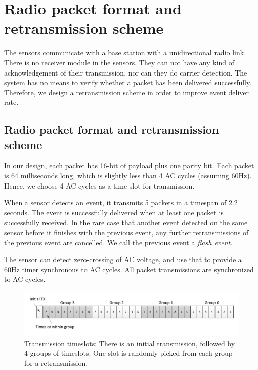 \chapter{Radio packet format and retransmission scheme}\label{chap4}

The sensors communicate with a base station with a unidirectional radio link. There is no receiver module in the sensors. They can not have any kind of acknowledgement of their transmission, nor can they do carrier detection. The system has no means to verify whether a packet has been delivered successfully. Therefore, we design a retransmission scheme in order to improve event deliver rate. 

\section{Radio packet format and retransmission scheme}

In our design, each packet has 16-bit of payload plus one parity bit. Each packet is 64 milliseconds long, which is slightly less than 4 AC cycles (assuming 60Hz). Hence, we choose 4 AC cycles as a time slot for transmission. 

When a sensor detects an event, it transmits 5 packets in a timespan of 2.2 seconds. The event is successfully delivered when at least one packet is successfully received. In the rare case that another event detected on the same sensor before it finishes with the previous event, any further retransmissions of the previous event are cancelled. We call the previous event a \textit{flash event}. 

The sensor can detect zero-crossing of AC voltage, and use that to provide a 60Hz timer synchronous to AC cycles. All packet transmissions are synchronized to AC cycles. 

\begin{figure}[htb]
  \centering
  \includegraphics[width=\textwidth]{figures/slots}
  \caption[Transmission timeslots]{Transmission timeslots: There is an initial transmission, followed by 4 groups of timeslots. One slot is randomly picked from each group for a retransmission. }
  \label{fig:slots}
\end{figure}

